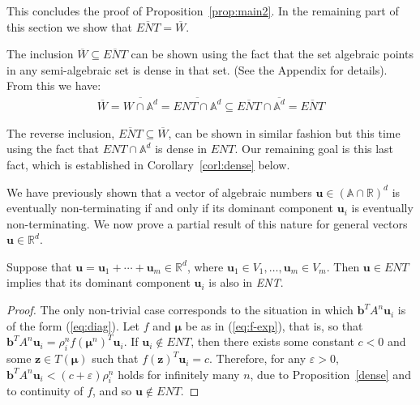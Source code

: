 This concludes the proof of Proposition~\ref{prop:main2}.
In the remaining part of this section we show that
$\overline{\mathit{ENT}}=\overline{W}$.

The inclusion $\overline{W}\subseteq \overline{ENT}$ can be shown
using the fact that the set algebraic points in any semi-algebraic set
is dense in that set. (See the Appendix for details).  From
this we have:
\begin{align*}
\overline{W}=\overline{W\cap\mathbb{A}^d}=\overline{\mathit{ENT}\cap\mathbb{A}^d} \subseteq \overline{\mathit{ENT}}\cap\overline{\mathbb{A}^d}=\overline{\mathit{ENT}}
\end{align*}

The reverse inclusion, $\overline{ENT}\subseteq\overline{W}$, can be
shown in similar fashion but this time using the fact that
$\mathit{ENT}\cap\mathbb{A}^d$ is dense in $\mathit{ENT}$.  Our
remaining goal is this last fact, which is established in
Corollary~\ref{corl:dense} below.

We have previously shown that a vector of algebraic numbers
$\boldsymbol{u}\in (\mathbb{A}\cap\mathbb{R})^d$ is eventually
non-terminating if and only if its dominant component
$\boldsymbol{u}_i$ is eventually non-terminating.  We now prove a
partial result of this nature for general vectors $\boldsymbol{u}\in
\mathbb{R}^d$.

\begin{proposition}
  Suppose that $\boldsymbol u=\boldsymbol u_1+\cdots+\boldsymbol
  u_m\in \mathbb{R}^d$, where $\boldsymbol u_1\in
  V_1,\ldots,\boldsymbol u_m\in V_m$. Then $\boldsymbol
  u\in\mathit{ENT}$ implies that its dominant component $\boldsymbol
  u_i$ is also in \textit{ENT}.
\label{prop:dom2}
\end{proposition}
\begin{proof}
  The only non-trivial case corresponds to the situation in which
  $\boldsymbol b^T A^n \boldsymbol u_i$ is of the form (\ref{eq:diag}).
  Let $f$ and $\boldsymbol \mu$ be as in (\ref{eq:f-exp}), that is, so
  that $\boldsymbol b^T A^n \boldsymbol u_i=\rho_i^n f (\boldsymbol
  \mu^n)^T \boldsymbol u_i$. If $\boldsymbol u_i\not\in\mathit{ENT}$,
  then there exists some constant $c<0$ and some $\boldsymbol z\in T(\boldsymbol \mu)$ such that $f(\boldsymbol z)^T \boldsymbol u_i=c$. Therefore, for any $\varepsilon>0$, $\boldsymbol b^T A^n \boldsymbol u_i<(c+\varepsilon)\rho_i^n$ holds for infinitely many $n$, due to Proposition~\ref{dense} and to continuity of $f$, and so $\boldsymbol u\not\in\mathit{ENT}$.
\end{proof}

